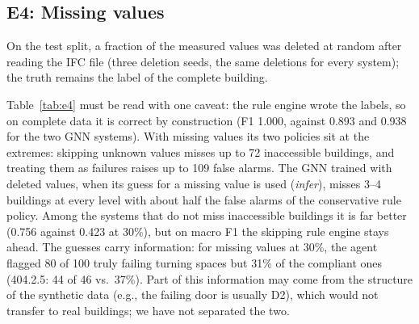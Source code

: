 \documentclass[conference]{IEEEtran}
\begin{document}
\subsection{E4: Missing values}

On the test split, a fraction of the measured values was deleted at random after reading the IFC file (three
deletion seeds, the same deletions for every system); the truth remains the label of the complete building.

\begin{table}[t]
\caption{E4: Verdict macro F1 with deleted values (mean of 3 seeds); in parentheses: missed inaccessible buildings
/ false alarms, out of 225 / 111}
\label{tab:e4}
\centering
\setlength{\tabcolsep}{3pt}
\end{table}

Table~\ref{tab:e4} must be read with one caveat: the rule engine wrote the labels, so on complete data it is correct
by construction (F1 1.000, against 0.893 and 0.938 for the two GNN systems). With missing values its two policies
sit at the extremes: skipping unknown values misses up to 72 inaccessible buildings, and treating them as failures
raises up to 109 false alarms. The GNN trained with deleted values, when its guess for a missing value is used
(\emph{infer}), misses 3--4 buildings at every level with about half the false alarms of the conservative rule
policy. Among the systems that do not miss inaccessible buildings it is far better (0.756 against 0.423 at 30\%), but
on macro F1 the skipping rule engine stays ahead. The guesses carry information: for missing values at 30\%, the
agent flagged 80 of 100 truly failing turning spaces but 31\% of the compliant ones (404.2.5: 44 of 46 vs.\ 37\%).
Part of this information may come from the structure of the synthetic data (e.g., the failing door is usually D2),
which would not transfer to real buildings; we have not separated the two.
\end{document}

